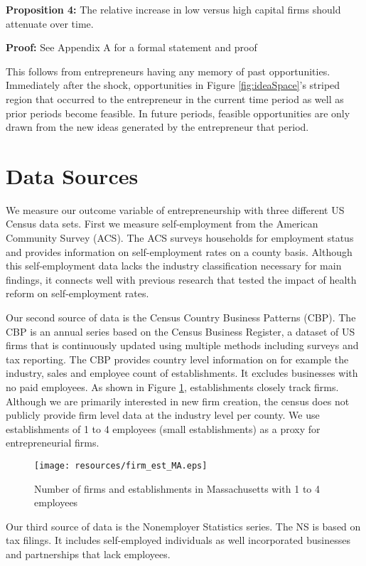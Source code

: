\documentclass[12pt]{article}
\begin{document}
\textbf{Proposition 4:} The relative increase in low versus high capital firms should attenuate over time. 

\textbf{Proof:} See Appendix A for a formal statement and proof

This follows from entrepreneurs having any memory of past opportunities. Immediately after the shock, opportunities in Figure \ref{fig:ideaSpace}'s striped region that occurred to the entrepreneur in the current time period as well as prior periods become feasible. In future periods, feasible opportunities are only drawn from the new ideas generated by the entrepreneur that period.


\section{Data Sources}
\label{sec:data}


We measure our outcome variable of entrepreneurship with three different US Census data sets. First we measure self-employment from the American Community Survey (ACS). The ACS surveys households for employment status and provides information on self-employment rates on a county basis. Although this self-employment data lacks the industry classification necessary for main findings, it connects well with previous research that tested the impact of health reform on self-employment rates. 

Our second source of data is the Census Country Business Patterns (CBP). The CBP is an annual series based on the Census Business Register, a dataset of US firms that is continuously updated using multiple methods including surveys and tax reporting. The CBP provides country level information on for example the industry, sales and employee count of establishments. It excludes businesses with no paid employees. As shown in Figure \ref{fig:firm_est}, establishments closely track firms. Although we are primarily interested in new firm creation, the census does not publicly provide firm level data at the industry level per county. We use establishments of 1 to 4 employees (small establishments) as a proxy for entrepreneurial firms. 

\begin{figure}[H]
	\centering
	\texttt{[image: resources/firm\_est\_MA.eps]}
	\caption{Number of firms and establishments in Massachusetts with 1 to 4 employees}
	\label{fig:firm_est}
\end{figure}

Our third source of data is the Nonemployer Statistics series. The NS is based on tax filings. It includes self-employed individuals as well incorporated businesses and partnerships that lack employees. 
\end{document}
